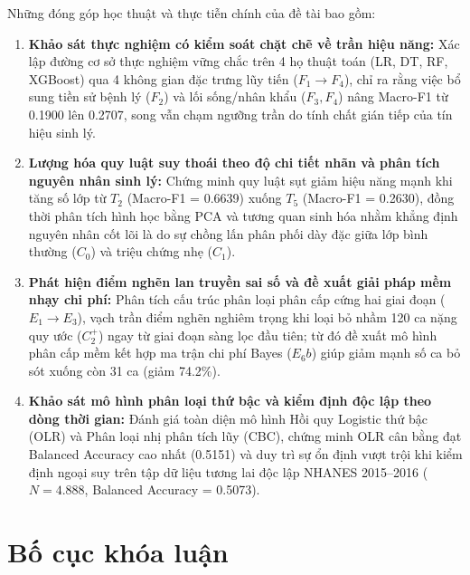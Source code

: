 Những đóng góp học thuật và thực tiễn chính của đề tài bao gồm:
\begin{enumerate}
    \item \textbf{Khảo sát thực nghiệm có kiểm soát chặt chẽ về trần hiệu năng:} Xác lập đường cơ sở thực nghiệm vững chắc trên 4 họ thuật toán (LR, DT, RF, XGBoost) qua 4 không gian đặc trưng lũy tiến ($F_1 \to F_4$), chỉ ra rằng việc bổ sung tiền sử bệnh lý ($F_2$) và lối sống/nhân khẩu ($F_3, F_4$) nâng Macro-F1 từ 0.1900 lên 0.2707, song vẫn chạm ngưỡng trần do tính chất gián tiếp của tín hiệu sinh lý.
    \item \textbf{Lượng hóa quy luật suy thoái theo độ chi tiết nhãn và phân tích nguyên nhân sinh lý:} Chứng minh quy luật sụt giảm hiệu năng mạnh khi tăng số lớp từ $T_2$ (Macro-F1 = 0.6639) xuống $T_5$ (Macro-F1 = 0.2630), đồng thời phân tích hình học bằng PCA và tương quan sinh hóa nhằm khẳng định nguyên nhân cốt lõi là do sự chồng lấn phân phối dày đặc giữa lớp bình thường ($C_0$) và triệu chứng nhẹ ($C_1$).
    \item \textbf{Phát hiện điểm nghẽn lan truyền sai số và đề xuất giải pháp mềm nhạy chi phí:} Phân tích cấu trúc phân loại phân cấp cứng hai giai đoạn ($E_1 \to E_3$), vạch trần điểm nghẽn nghiêm trọng khi loại bỏ nhầm 120 ca nặng quy ước ($C_2^+$) ngay từ giai đoạn sàng lọc đầu tiên; từ đó đề xuất mô hình phân cấp mềm kết hợp ma trận chi phí Bayes ($E_6b$) giúp giảm mạnh số ca bỏ sót xuống còn 31 ca (giảm 74.2\%).
    \item \textbf{Khảo sát mô hình phân loại thứ bậc và kiểm định độc lập theo dòng thời gian:} Đánh giá toàn diện mô hình Hồi quy Logistic thứ bậc (OLR) và Phân loại nhị phân tích lũy (CBC), chứng minh OLR cân bằng đạt Balanced Accuracy cao nhất (0.5151) và duy trì sự ổn định vượt trội khi kiểm định ngoại suy trên tập dữ liệu tương lai độc lập NHANES 2015--2016 ($N = 4.888$, Balanced Accuracy = 0.5073).
\end{enumerate}

\section{Bố cục khóa luận}
\label{sec:bo-cuc-khoa-luan}

